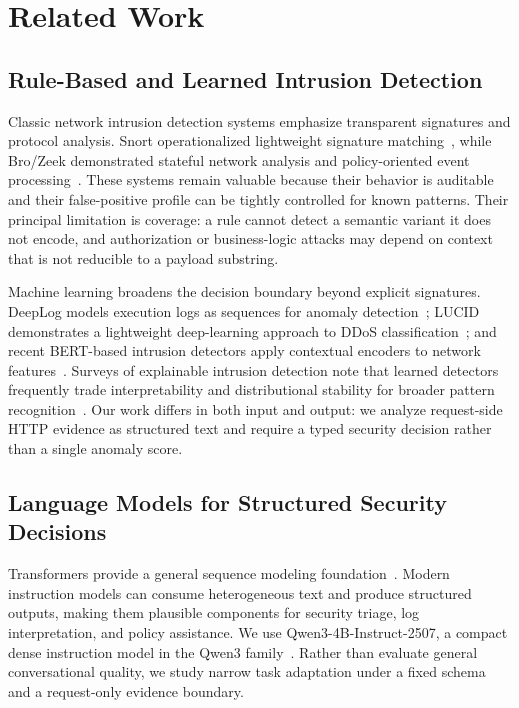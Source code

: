 \section{Related Work}
\label{sec:related}

\subsection{Rule-Based and Learned Intrusion Detection}
Classic network intrusion detection systems emphasize transparent signatures and protocol analysis. Snort operationalized lightweight signature matching~\cite{roesch1999snort}, while Bro/Zeek demonstrated stateful network analysis and policy-oriented event processing~\cite{paxson1999bro}. These systems remain valuable because their behavior is auditable and their false-positive profile can be tightly controlled for known patterns. Their principal limitation is coverage: a rule cannot detect a semantic variant it does not encode, and authorization or business-logic attacks may depend on context that is not reducible to a payload substring.

Machine learning broadens the decision boundary beyond explicit signatures. DeepLog models execution logs as sequences for anomaly detection~\cite{du2017deeplog}; LUCID demonstrates a lightweight deep-learning approach to DDoS classification~\cite{doriguzzi2020lucid}; and recent BERT-based intrusion detectors apply contextual encoders to network features~\cite{yang2025bertids}. Surveys of explainable intrusion detection note that learned detectors frequently trade interpretability and distributional stability for broader pattern recognition~\cite{neupane2022xids}. Our work differs in both input and output: we analyze request-side HTTP evidence as structured text and require a typed security decision rather than a single anomaly score.

\subsection{Language Models for Structured Security Decisions}
Transformers provide a general sequence modeling foundation~\cite{vaswani2017attention}. Modern instruction models can consume heterogeneous text and produce structured outputs, making them plausible components for security triage, log interpretation, and policy assistance. We use Qwen3-4B-Instruct-2507, a compact dense instruction model in the Qwen3 family~\cite{qwen3,qwen2507}. Rather than evaluate general conversational quality, we study narrow task adaptation under a fixed schema and a request-only evidence boundary.

